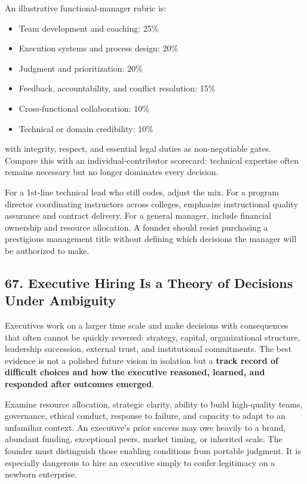 An illustrative functional-manager rubric is:
\begin{itemize}[leftmargin=*]
\item Team development and coaching: 25\%
\item Execution systems and process design: 20\%
\item Judgment and prioritization: 20\%
\item Feedback, accountability, and conflict resolution: 15\%
\item Cross-functional collaboration: 10\%
\item Technical or domain credibility: 10\%
\end{itemize}
with integrity, respect, and essential legal duties as non-negotiable gates. Compare this with an individual-contributor scorecard: technical expertise often remains necessary but no longer dominates every decision.

For a 1st-line technical lead who still codes, adjust the mix. For a program director coordinating instructors across colleges, emphasize instructional quality assurance and contract delivery. For a general manager, include financial ownership and resource allocation. A founder should resist purchasing a prestigious management title without defining which decisions the manager will be authorized to make.

\subsection*{67. Executive Hiring Is a Theory of Decisions Under Ambiguity}

Executives work on a larger time scale and make decisions with consequences that often cannot be quickly reversed: strategy, capital, organizational structure, leadership succession, external trust, and institutional commitments. The best evidence is not a polished future vision in isolation but a \textbf{track record of difficult choices and how the executive reasoned, learned, and responded after outcomes emerged}.

Examine resource allocation, strategic clarity, ability to build high-quality teams, governance, ethical conduct, response to failure, and capacity to adapt to an unfamiliar context. An executive's prior success may owe heavily to a brand, abundant funding, exceptional peers, market timing, or inherited scale. The founder must distinguish those enabling conditions from portable judgment. It is especially dangerous to hire an executive simply to confer legitimacy on a newborn enterprise.

